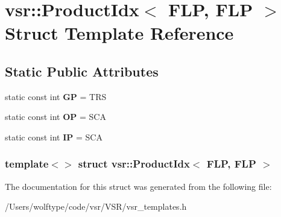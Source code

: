\hypertarget{structvsr_1_1_product_idx_3_01_f_l_p_00_01_f_l_p_01_4}{\section{vsr\-:\-:Product\-Idx$<$ F\-L\-P, F\-L\-P $>$ Struct Template Reference}
\label{structvsr_1_1_product_idx_3_01_f_l_p_00_01_f_l_p_01_4}
}
\subsection*{Static Public Attributes}
\begin{DoxyCompactItemize}
\item 
\hypertarget{structvsr_1_1_product_idx_3_01_f_l_p_00_01_f_l_p_01_4_a58cdd54ef9049eba7aeeb3a9117413f6}{static const int {\bfseries G\-P} = T\-R\-S}\label{structvsr_1_1_product_idx_3_01_f_l_p_00_01_f_l_p_01_4_a58cdd54ef9049eba7aeeb3a9117413f6}

\item 
\hypertarget{structvsr_1_1_product_idx_3_01_f_l_p_00_01_f_l_p_01_4_a9ddbe108f070a2e0db5b56eb7f0aae05}{static const int {\bfseries O\-P} = S\-C\-A}\label{structvsr_1_1_product_idx_3_01_f_l_p_00_01_f_l_p_01_4_a9ddbe108f070a2e0db5b56eb7f0aae05}

\item 
\hypertarget{structvsr_1_1_product_idx_3_01_f_l_p_00_01_f_l_p_01_4_af32d8528a96c396c32c11834007e22f9}{static const int {\bfseries I\-P} = S\-C\-A}\label{structvsr_1_1_product_idx_3_01_f_l_p_00_01_f_l_p_01_4_af32d8528a96c396c32c11834007e22f9}

\end{DoxyCompactItemize}
\subsubsection*{template$<$$>$ struct vsr\-::\-Product\-Idx$<$ F\-L\-P, F\-L\-P $>$}



The documentation for this struct was generated from the following file\-:\begin{DoxyCompactItemize}
\item 
/\-Users/wolftype/code/vsr/\-V\-S\-R/vsr\-\_\-templates.\-h\end{DoxyCompactItemize}
